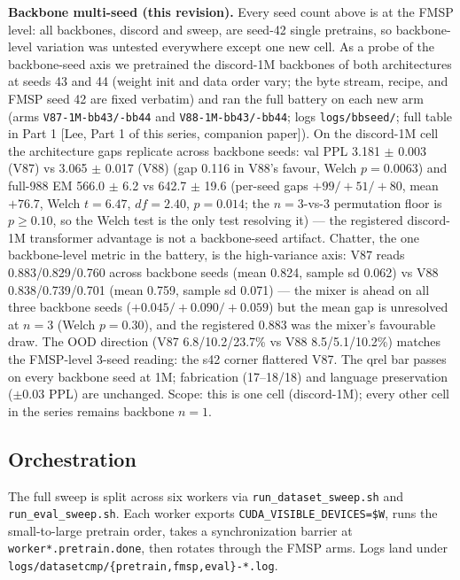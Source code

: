 \documentclass[11pt]{article}
\begin{document}
\textbf{Backbone multi-seed (this revision).} Every seed count above is at the FMSP level: all backbones, discord and sweep, are seed-42 single pretrains, so backbone-level variation was untested everywhere except one new cell. As a probe of the backbone-seed axis we pretrained the discord-1M backbones of both architectures at seeds 43 and 44 (weight init and data order vary; the byte stream, recipe, and FMSP seed 42 are fixed verbatim) and ran the full battery on each new arm (arms \texttt{V87-1M-bb43/-bb44} and \texttt{V88-1M-bb43/-bb44}; logs \texttt{logs/bbseed/}; full table in Part 1 [Lee, Part 1 of this series, companion paper]). On the discord-1M cell the architecture gaps replicate across backbone seeds: val PPL 3.181 $\pm$ 0.003 (V87) vs 3.065 $\pm$ 0.017 (V88) (gap 0.116 in V88's favour, Welch $p = 0.0063$) and full-988 EM 566.0 $\pm$ 6.2 vs 642.7 $\pm$ 19.6 (per-seed gaps $+99/+51/+80$, mean $+76.7$, Welch $t = 6.47$, $df = 2.40$, $p = 0.014$; the $n = 3$-vs-3 permutation floor is $p \geq 0.10$, so the Welch test is the only test resolving it) --- the registered discord-1M transformer advantage is not a backbone-seed artifact. Chatter, the one backbone-level metric in the battery, is the high-variance axis: V87 reads 0.883/0.829/0.760 across backbone seeds (mean 0.824, sample sd 0.062) vs V88 0.838/0.739/0.701 (mean 0.759, sample sd 0.071) --- the mixer is ahead on all three backbone seeds ($+0.045/+0.090/+0.059$) but the mean gap is unresolved at $n = 3$ (Welch $p = 0.30$), and the registered 0.883 was the mixer's favourable draw. The OOD direction (V87 6.8/10.2/23.7\% vs V88 8.5/5.1/10.2\%) matches the FMSP-level 3-seed reading: the s42 corner flattered V87. The qrel bar passes on every backbone seed at 1M; fabrication (17--18/18) and language preservation ($\pm 0.03$ PPL) are unchanged. Scope: this is one cell (discord-1M); every other cell in the series remains backbone $n = 1$.

\subsection{Orchestration}

The full sweep is split across six workers via \texttt{run\_dataset\_sweep.sh} and \texttt{run\_eval\_sweep.sh}. Each worker exports \texttt{CUDA\_VISIBLE\_DEVICES=\$W}, runs the small-to-large pretrain order, takes a synchronization barrier at \texttt{worker*.pretrain.done}, then rotates through the FMSP arms. Logs land under \texttt{logs/datasetcmp/\{pretrain,fmsp,eval\}-*.log}.
\end{document}
